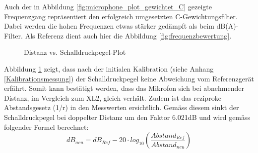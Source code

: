 \documentclass[12pt]{article}
\begin{document}
		\noindent Auch der in Abbildung  \ref{fig:microphone_plot_gewichtet_C} gezeigte Frequenzgang repräsentiert den erfolgreich umgesetzten C-Gewichtungsfilter. Dabei werden die hohen Frequenzen etwas stärker gedämpft als beim dB(A)-Filter. Als Referenz dient auch hier die Abbildung \ref{fig:frequenzbewertung}.
		\begin{figure}[H]
		\centering
			\caption{Distanz vs. Schalldruckpegel-Plot}
			\label{fig:microphone_plot_distanz}
		\end{figure}
	\noindent Abbildung \ref{fig:microphone_plot_distanz} zeigt, dass nach der initialen Kalibration (siehe Anhang \ref{Kalibrationsmessung}) der Schalldruckpegel keine Abweichung vom Referenzgerät erfährt. Somit kann bestätigt werden, dass das Mikrofon sich bei abnehmender Distanz, im Vergleich zum XL2, gleich verhält. Zudem ist das reziproke Abstandsgesetz (\color{green}1/r\color{black}) in den Messwerten ersichtlich. Gemäss diesem sinkt der Schalldruckpegel bei doppelter Distanz um den Faktor 6.021dB und wird gemäss folgender Formel berechnet:
	\begin{equation}\label{eq:Abstandsgesetz}
		dB_{neu} = dB_{Ref} - 20 \cdot log_{10}\left( \frac{Abstand_{Ref}}{Abstand_{neu}}\right) 
	\end{equation}
	
	\newpage
\end{document}
